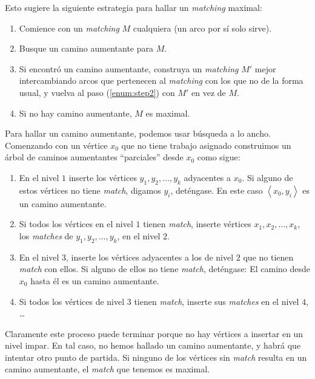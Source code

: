   Esto sugiere la siguiente estrategia
  para hallar un \emph{\foreignlanguage{english}{matching}} maximal:
  \begin{enumerate}
  \item \label{enum:step1}
    Comience
    con
    un \emph{\foreignlanguage{english}{matching}} \(M\) cualquiera
    (un arco por sí solo sirve).
  \item \label{enum:step2}
    Busque un camino aumentante para \(M\).
  \item \label{enum:step3}
    Si encontró un camino aumentante,
    construya un \emph{\foreignlanguage{english}{matching}} \(M'\)
    mejor intercambiando arcos
    que pertenecen
    al \emph{\foreignlanguage{english}{matching}} con los que no
    de la forma usual,
    y vuelva al paso (\ref{enum:step2}) con \(M'\) en vez de \(M\).
  \item \label{enum:step4}
    Si no hay camino aumentante,
    \(M\) es maximal.
  \end{enumerate}
  Para hallar un camino aumentante,
  podemos usar búsqueda a lo ancho.
  Comenzando
  con un vértice \(x_0\) que no tiene trabajo asignado
  construimos un árbol
  de caminos aumentantes ``parciales'' desde \(x_0\)
  como sigue:
  \begin{enumerate}
  \item
    En el nivel \(1\) inserte los vértices \(y_1, y_2, \dotsc, y_k\)
    adyacentes a \(x_0\).
    Si alguno de estos vértices
    no tiene \emph{\foreignlanguage{english}{match}},
    digamos \(y_i\),
    deténgase.
    En este caso \(\left\langle x_0, y_i \right\rangle\)
    es un camino aumentante.
  \item
    Si todos los vértices en el nivel \(1\)
    tienen \emph{\foreignlanguage{english}{match}},
    inserte vértices \(x_1, x_2, \dotsc, x_k\),
    los \emph{\foreignlanguage{english}{matches}}
    de \(y_1, y_2, \dotsc, y_k\),
    en el nivel \(2\).
  \item
    En el nivel \(3\),
    inserte los vértices adyacentes a los de nivel \(2\)
    que no tienen \emph{\foreignlanguage{english}{match}} con ellos.
    Si alguno de ellos
    no tiene \emph{\foreignlanguage{english}{match}},
    deténgase:
    El camino desde \(x_0\) hasta él es un camino aumentante.
  \item
    Si todos los vértices de nivel \(3\)
    tienen \emph{\foreignlanguage{english}{match}},
    inserte sus \emph{\foreignlanguage{english}{matches}}
    en el nivel \(4\),
    \ldots
  \end{enumerate}
  Claramente este proceso puede terminar
  porque no hay vértices a insertar en un nivel impar.
  En tal caso,
  no hemos hallado un camino aumentante,
  y habrá que intentar otro punto de partida.
  Si ninguno de los vértices
  sin \emph{\foreignlanguage{english}{match}}
  resulta en un camino aumentante,
  el \emph{\foreignlanguage{english}{match}} que tenemos es maximal.

